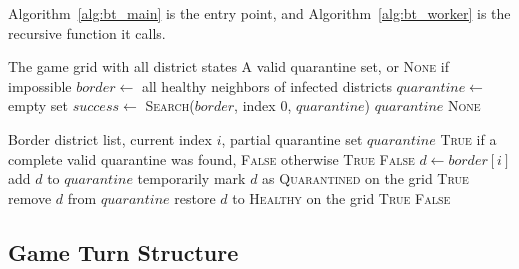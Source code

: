 \documentclass[12pt, a4paper]{article}
\begin{document}
Algorithm~\ref{alg:bt_main} is the entry point, and
Algorithm~\ref{alg:bt_worker} is the recursive function it calls.
\vspace{-10pt}
\begin{algorithm}[ht]
\caption{Backtracking Quarantine --- Entry Point}
\label{alg:bt_main}
\begin{algorithmic}[1]
\REQUIRE The game grid with all district states
\ENSURE A valid quarantine set, or \textsc{None} if impossible
\STATE $\mathit{border} \leftarrow$ all healthy neighbors of infected districts
\STATE $\mathit{quarantine} \leftarrow$ empty set
\STATE $\mathit{success} \leftarrow$
       \textsc{Search}($\mathit{border}$, index $0$, $\mathit{quarantine}$)
  \RETURN $\mathit{quarantine}$
\ELSE
  \RETURN \textsc{None}
\ENDIF
\end{algorithmic}
\end{algorithm}
\vspace{-25pt}
\begin{algorithm}[ht]
\caption{Search --- Recursive Backtracking Step}
\label{alg:bt_worker}
\begin{algorithmic}[1]
\REQUIRE Border district list, current index $i$,
         partial quarantine set $\mathit{quarantine}$
\ENSURE \textsc{True} if a complete valid quarantine was found,
        \textsc{False} otherwise
  \RETURN \textsc{True}
\ENDIF
{}
  \RETURN \textsc{False}
\ENDIF
\STATE $d \leftarrow \mathit{border}[i]$
\STATE add $d$ to $\mathit{quarantine}$
\STATE temporarily mark $d$ as \textsc{Quarantined} on the grid
    \RETURN \textsc{True}
  \ENDIF
\ENDIF
{}
\STATE remove $d$ from $\mathit{quarantine}$
\STATE restore $d$ to \textsc{Healthy} on the grid
  \RETURN \textsc{True}
\ENDIF
\RETURN \textsc{False}
\end{algorithmic}
\end{algorithm}

\subsection{Game Turn Structure}
\end{document}
